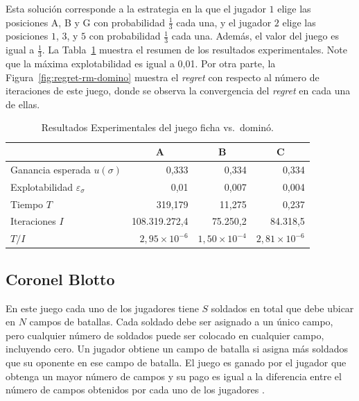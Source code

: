 Esta solución corresponde a la estrategia en la que el jugador $1$ elige las posiciones A, B y G con probabilidad $\frac{1}{3}$ cada una, y el jugador $2$ elige las posiciones $1$, $3$, y $5$ con probabilidad $\frac{1}{3}$ cada una. Además, el valor del juego es igual a $\frac{1}{3}$. La Tabla~\ref{table:resultados-rm-domino} muestra el resumen de los resultados experimentales. Note que la máxima explotabilidad es igual a 0,01. Por otra parte, la Figura~\ref{fig:regret-rm-domino} muestra el \textit{regret} con respecto al número de iteraciones de este juego, donde se observa la convergencia del \textit{regret} en cada una de ellas.

\begin{table}[h]
\caption{Resultados Experimentales del juego ficha vs.\ dominó.}
\label{table:resultados-rm-domino}
\centering
\begin{tabular}{l r r r}
    \toprule
    & \multicolumn{1}{c}{A} & \multicolumn{1}{c}{B} & \multicolumn{1}{c}{C} \\ \midrule
    Ganancia esperada $u(\sigma)$ & 0,333 & 0,334 & 0,334  \\
    Explotabilidad $\varepsilon_{\sigma}$ & 0,01 & 0,007 & 0,004 \\
    Tiempo $T$ & 319,179 & 11,275 & 0,237  \\
    Iteraciones $I$ & 108.319.272,4 & 75.250,2 & 84.318,5 \\
    $T/I$ & $2,95 {\times} 10^{-6}$ & $1,50 {\times} 10^{-4}$ & $2,81 {\times} 10^{-6}$ \\
    \bottomrule
\end{tabular}
\end{table}
 
\subsection*{Coronel Blotto}

En este juego cada uno de los jugadores tiene $S$ soldados en total que debe ubicar en $N$ campos de batallas. Cada soldado debe ser asignado a un único campo, pero cualquier número de soldados puede ser colocado en cualquier campo, incluyendo cero. Un jugador obtiene un campo de batalla si asigna más soldados que su oponente en ese campo de batalla. El juego es ganado por el jugador que obtenga un mayor número de campos y su pago es igual a la diferencia entre el número de campos obtenidos por cada uno de los jugadores \cite{bib:blotto-game}.

